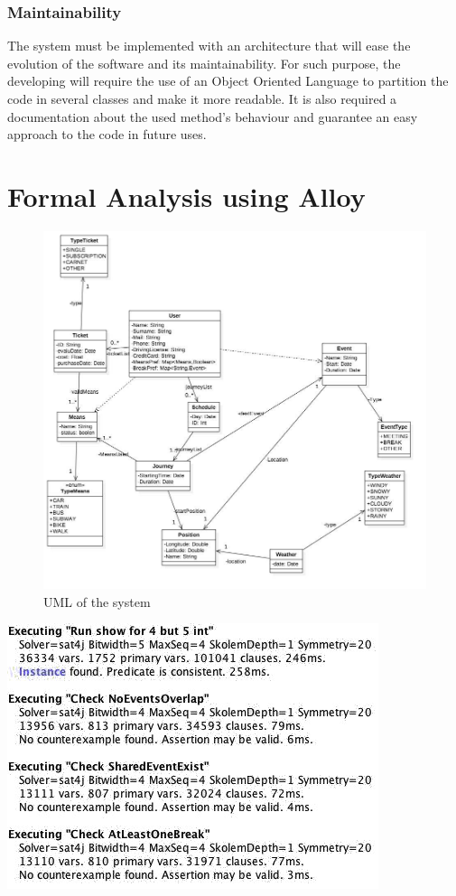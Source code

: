 \documentclass[numbers=noenddot, 12pt, a4paper, oneside]{scrbook}
\begin{document}
\subsection*{Maintainability}

The system must be implemented with an architecture that will ease the evolution of the software and its maintainability. For such purpose, the developing will require the use of an Object Oriented Language to partition the code in several classes and make it more readable. It is also required a documentation about the used method's behaviour and guarantee an easy approach to the code in future uses.


\chapter{Formal Analysis using Alloy}

\begin{figure}[H]
	\centering
	\includegraphics[width=1\textwidth]{uml}
	\caption{UML of the system}
\end{figure}





\includegraphics[]{result}
\end{document}
